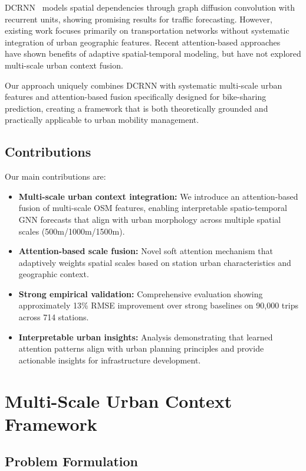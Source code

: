 \documentclass[sigconf,review,nonacm]{acmart}
\begin{document}
DCRNN~\cite{li2018} models spatial dependencies through graph diffusion convolution with recurrent units, showing promising results for traffic forecasting. However, existing work focuses primarily on transportation networks without systematic integration of urban geographic features. Recent attention-based approaches~\cite{wu2019,guo2020} have shown benefits of adaptive spatial-temporal modeling, but have not explored multi-scale urban context fusion.

Our approach uniquely combines DCRNN with systematic multi-scale urban features and attention-based fusion specifically designed for bike-sharing prediction, creating a framework that is both theoretically grounded and practically applicable to urban mobility management.

\subsection{Contributions}

Our main contributions are:
\begin{itemize}
\item \textbf{Multi-scale urban context integration:} We introduce an attention-based fusion of multi-scale OSM features, enabling interpretable spatio-temporal GNN forecasts that align with urban morphology across multiple spatial scales (500m/1000m/1500m).

\item \textbf{Attention-based scale fusion:} Novel soft attention mechanism that adaptively weights spatial scales based on station urban characteristics and geographic context.

\item \textbf{Strong empirical validation:} Comprehensive evaluation showing approximately 13\% RMSE improvement over strong baselines on 90,000 trips across 714 stations.

\item \textbf{Interpretable urban insights:} Analysis demonstrating that learned attention patterns align with urban planning principles and provide actionable insights for infrastructure development.
\end{itemize}

\section{Multi-Scale Urban Context Framework}

\subsection{Problem Formulation}
\end{document}
